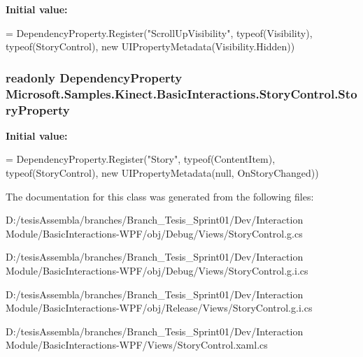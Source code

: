 {\bfseries Initial value\-:}
\begin{DoxyCode}
=
            DependencyProperty.Register(\textcolor{stringliteral}{"ScrollUpVisibility"}, typeof(Visibility), typeof(StoryControl), \textcolor{keyword}{new}
       UIPropertyMetadata(Visibility.Hidden))
\end{DoxyCode}
\hypertarget{class_microsoft_1_1_samples_1_1_kinect_1_1_basic_interactions_1_1_story_control_a224e191a4f8d0416052197a82fabf57a}{
\subsubsection[{Story\-Property}]{\setlength{\rightskip}{0pt plus 5cm}readonly Dependency\-Property Microsoft.\-Samples.\-Kinect.\-Basic\-Interactions.\-Story\-Control.\-Story\-Property\hspace{0.3cm}{\ttfamily [static]}}}\label{class_microsoft_1_1_samples_1_1_kinect_1_1_basic_interactions_1_1_story_control_a224e191a4f8d0416052197a82fabf57a}
{\bfseries Initial value\-:}
\begin{DoxyCode}
=
            DependencyProperty.Register(\textcolor{stringliteral}{"Story"}, typeof(ContentItem), typeof(StoryControl), \textcolor{keyword}{new} 
      UIPropertyMetadata(null, OnStoryChanged))
\end{DoxyCode}


The documentation for this class was generated from the following files\-:\begin{DoxyCompactItemize}
\item 
D\-:/tesis\-Assembla/branches/\-Branch\-\_\-\-Tesis\-\_\-\-Sprint01/\-Dev/\-Interaction Module/\-Basic\-Interactions-\/\-W\-P\-F/obj/\-Debug/\-Views/Story\-Control.\-g.\-cs\item 
D\-:/tesis\-Assembla/branches/\-Branch\-\_\-\-Tesis\-\_\-\-Sprint01/\-Dev/\-Interaction Module/\-Basic\-Interactions-\/\-W\-P\-F/obj/\-Debug/\-Views/Story\-Control.\-g.\-i.\-cs\item 
D\-:/tesis\-Assembla/branches/\-Branch\-\_\-\-Tesis\-\_\-\-Sprint01/\-Dev/\-Interaction Module/\-Basic\-Interactions-\/\-W\-P\-F/obj/\-Release/\-Views/Story\-Control.\-g.\-i.\-cs\item 
D\-:/tesis\-Assembla/branches/\-Branch\-\_\-\-Tesis\-\_\-\-Sprint01/\-Dev/\-Interaction Module/\-Basic\-Interactions-\/\-W\-P\-F/\-Views/Story\-Control.\-xaml.\-cs\end{DoxyCompactItemize}
